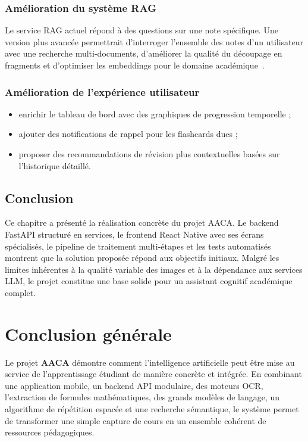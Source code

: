 \documentclass[12pt,a4paper]{report}
\begin{document}
\subsection{Amélioration du système RAG}

Le service RAG actuel répond à des questions sur une note spécifique. Une version plus avancée permettrait d'interroger l'ensemble des notes d'un utilisateur avec une recherche multi-documents, d'améliorer la qualité du découpage en fragments et d'optimiser les embeddings pour le domaine académique~\cite{lewis2020}.

\subsection{Amélioration de l'expérience utilisateur}

\begin{itemize}[label=--]
    \item enrichir le tableau de bord avec des graphiques de progression temporelle ;
    \item ajouter des notifications de rappel pour les flashcards dues ;
    \item proposer des recommandations de révision plus contextuelles basées sur l'historique détaillé.
\end{itemize}

\section{Conclusion}

Ce chapitre a présenté la réalisation concrète du projet AACA. Le backend FastAPI structuré en services, le frontend React Native avec ses écrans spécialisés, le pipeline de traitement multi-étapes et les tests automatisés montrent que la solution proposée répond aux objectifs initiaux. Malgré les limites inhérentes à la qualité variable des images et à la dépendance aux services LLM, le projet constitue une base solide pour un assistant cognitif académique complet.

\chapter*{Conclusion générale}

Le projet \textbf{AACA} démontre comment l'intelligence artificielle peut être mise au service de l'apprentissage étudiant de manière concrète et intégrée. En combinant une application mobile, un backend API modulaire, des moteurs OCR, l'extraction de formules mathématiques, des grands modèles de langage, un algorithme de répétition espacée et une recherche sémantique, le système permet de transformer une simple capture de cours en un ensemble cohérent de ressources pédagogiques.
\end{document}
